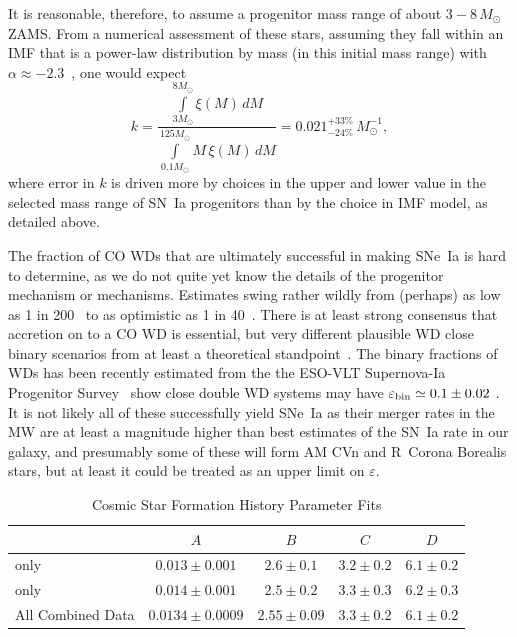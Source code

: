 \documentclass[apj]{aastex62}
\begin{document}
It is reasonable, therefore, to assume a progenitor mass range of about $3-8\,M_{\odot}$ ZAMS. From a numerical assessment of these stars, assuming they fall within an IMF that is a power-law distribution by mass (in this initial mass range) with $\alpha\approx-2.3$~\citep{Salpeter:1955rw,Kroupa:2001gf}, one would expect 
\begin{equation}
k = \frac{\int\limits_{3M_{\odot}}^{8M_{\odot}} \xi(M)\,dM}{\int\limits_{0.1M_{\odot}}^{125M_{\odot}} M\,\xi(M)\,dM}= 0.021^{+33\%}_{-24\%}\,M_{\odot}^{-1},
\end{equation}
\noindent where error in $k$ is driven more by choices in the upper and lower value in the selected mass range of SN~Ia progenitors than by the choice in IMF model, as detailed above.

The fraction of CO WDs that are ultimately successful in making SNe~Ia is hard to determine, as we do not quite yet know the details of the progenitor mechanism or mechanisms. Estimates swing rather wildly from (perhaps) as low as 1 in 200~\citep{Breedt:2017rp} to as optimistic as 1 in 40~\citep{Maoz:2012}. There is at least strong consensus that accretion on to a CO WD is essential, but very different plausible WD close binary scenarios from at least a theoretical standpoint~\citep{Nelemans:2001hb,Nelemans:2001cs}. The binary fractions of WDs has been recently estimated from the  the ESO-VLT Supernova-Ia Progenitor Survey~\citep[ SPY]{Napiwotzki:2007} show close double WD systems may have $\varepsilon_{\rm bin}\simeq0.1\pm0.02$ \citep{Maoz:2017zl}. It is not likely all of these successfully yield SNe~Ia as their merger rates in the MW are at least a magnitude higher than best estimates of the SN~Ia rate in our galaxy, and presumably some of these will form AM CVn and R~Corona Borealis stars, but at least it could be treated as an upper limit on $\varepsilon$.


\begin{table}[t]
    \centering
    \caption{Cosmic Star Formation History Parameter Fits}
    \label{tab:csfh_fits}
    \begin{tabular}{lcccc}
         & $A$ & $B$ & $C$ & $D$ \\
        \hline
        \hline
	\cite{Madau:2014fk} only & $0.013 \pm 0.001$ & $2.6 \pm 0.1$ & $3.2 \pm 0.2$ & $6.1 \pm 0.2$\\
	\cite{Driver:2018nr}\tablenotemark{a} only & $0.014 \pm 0.001$ & $2.5 \pm 0.2$ & $3.3 \pm 0.3$ & $6.2 \pm 0.3$\\
	\hline
	All Combined Data & $0.0134 \pm 0.0009$ & $2.55 \pm 0.09$ & $3.3 \pm 0.2$ & $6.1 \pm 0.2$\\
	\hline
    \end{tabular}
\end{table}
 
\end{document}
